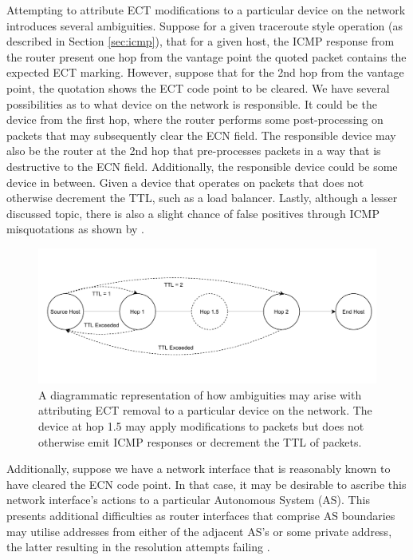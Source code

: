 \documentclass{l4proj}
\begin{document}
Attempting to attribute ECT modifications to a particular device on the network introduces several ambiguities. Suppose for a given traceroute style operation (as described in Section \ref{sec:icmp}), that for a given host, the ICMP response from the router present one hop from the vantage point the quoted packet contains the expected ECT marking. However, suppose that for the 2nd hop from the vantage point, the quotation shows the ECT code point to be cleared. We have several possibilities as to what device on the network is responsible. It could be the device from the first hop, where the router performs some post-processing on packets that may subsequently clear the ECN field. The responsible device may also be the router at the 2nd hop that pre-processes packets in a way that is destructive to the ECN field. Additionally, the responsible device could be some device in between. Given a device that operates on packets that does not otherwise decrement the TTL, such as a load balancer. Lastly, although a lesser discussed topic, there is also a slight chance of false positives through ICMP misquotations as shown by \cite{malone_analysis_2007}.

\begin{figure}[H]
\centering
\includegraphics[width=14cm,keepaspectratio]{dissertation/images/ambig_icmp.pdf}
\caption{A diagrammatic representation of how ambiguities may arise with attributing ECT removal to a particular device on the network. The device at hop 1.5 may apply modifications to packets but does not otherwise emit ICMP responses or decrement the TTL of packets.}
\label{fig:icmpambig}
\end{figure}

Additionally, suppose we have a network interface that is reasonably known to have cleared the ECN code point. In that case, it may be desirable to ascribe this network interface's actions to a particular Autonomous System (AS). This presents additional difficulties as router interfaces that comprise AS boundaries may utilise addresses from either of the adjacent AS's or some private address, the latter resulting in the resolution attempts failing \cite{mcquistin_is_2015}.
\end{document}
